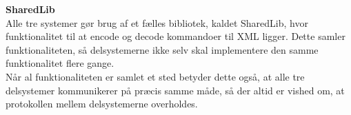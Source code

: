 \textbf{SharedLib}\\
Alle tre systemer gør brug af et fælles bibliotek, kaldet SharedLib, hvor funktionalitet til at encode og decode kommandoer til XML ligger. Dette samler funktionaliteten, så delsystemerne ikke selv skal implementere den samme funktionalitet flere gange.\\
Når al funktionaliteten er samlet et sted betyder dette også, at alle tre delsystemer kommunikerer på præcis samme måde, så der altid er vished om, at protokollen mellem delsystemerne overholdes.\\